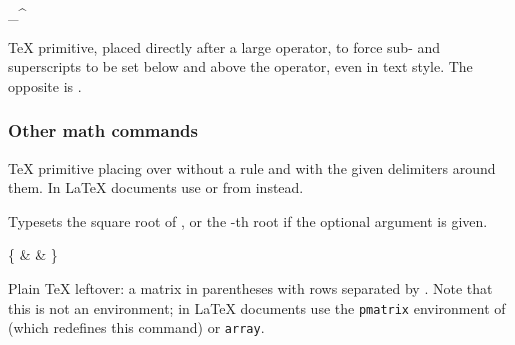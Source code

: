 \documentclass{l3in2edoc}
\begin{document}
\begin{function}[user]
  {
    \limits
  }
  \begin{syntax}
    \_\^
  \end{syntax}
  \TeX{} primitive, placed directly after a large operator, to force
  sub- and superscripts to be set below and above the operator, even
  in text style. The opposite is .
\end{function}



\subsubsection{Other math commands}

\begin{function}[]
  {
    \atopwithdelims
  }
  \begin{syntax}
  \end{syntax}
  \TeX{} primitive placing  over  without a
  rule and with the given delimiters around them. In \LaTeX{}
  documents use  or  from 
  instead.
\end{function}



\begin{function}[user]
  {
    \sqrt
  }
  \begin{syntax}
      
  \end{syntax}
  Typesets the square root of , or the -th root
  if the optional argument is given.
\end{function}




\begin{function}[]
  {
    \pmatrix
  }
  \begin{syntax}
    \{ \&    \& \}
  \end{syntax}
  Plain \TeX{} leftover: a matrix in parentheses with rows separated
  by . Note that this is not an environment; in \LaTeX{}
  documents use the \texttt{pmatrix} environment of 
  (which redefines this command) or \texttt{array}.
\end{function}
\end{document}
